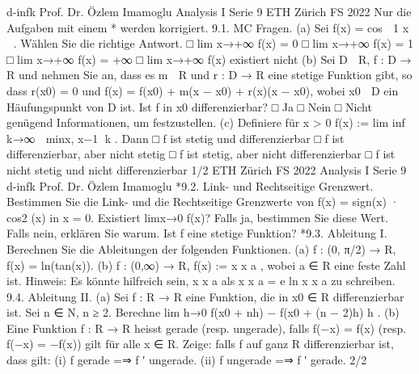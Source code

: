 d-infk
Prof. Dr. Özlem Imamoglu
Analysis I
Serie 9
ETH Zürich
FS 2022
Nur die Aufgaben mit einem * werden korrigiert.
9.1. MC Fragen.
(a) Sei f(x) = cos 
1
x

. Wählen Sie die richtige Antwort.
□ lim x→+∞
f(x) = 0
□ lim x→+∞
f(x) = 1
□ lim x→+∞
f(x) = +∞
□ lim x→+∞
f(x) existiert nicht
(b) Sei D ⊂ R, f : D → R und nehmen Sie an, dass es m ∈ R und r : D → R eine
stetige Funktion gibt, so dass r(x0) = 0 und
f(x) = f(x0) + m(x − x0) + r(x)(x − x0),
wobei x0 ∈ D ein Häufungspunkt von D ist. Ist f in x0 differenzierbar?
□ Ja
□ Nein
□ Nicht genügend Informationen, um festzustellen.
(c) Definiere für x > 0
f(x) := lim inf
k→∞

min{x, x−1
}
k
.
Dann
□ f ist stetig und differenzierbar
□ f ist differenzierbar, aber nicht stetig
□ f ist stetig, aber nicht differenzierbar
□ f ist nicht stetig und nicht differenzierbar
1/2
ETH Zürich
FS 2022
Analysis I
Serie 9
d-infk
Prof. Dr. Özlem Imamoglu
*9.2. Link- und Rechtseitige Grenzwert. Bestimmen Sie die Link- und die
Rechtseitige Grenzwerte von
f(x) = sign(x) · cos2
(x)
in x = 0. Existiert limx→0
f(x)? Falls ja, bestimmen Sie diese Wert. Falls nein, erklären
Sie warum. Ist f eine stetige Funktion?
*9.3. Ableitung I. Berechnen Sie die Ableitungen der folgenden Funktionen.
(a) f : (0, π/2) → R, f(x) = ln(tan(x)).
(b) f : (0,∞) → R, f(x) := x
x
a
, wobei a ∈ R eine feste Zahl ist.
Hinweis: Es könnte hilfreich sein, x
x
a
als x
x
a
= e
ln x
x
a
zu schreiben.
9.4. Ableitung II.
(a) Sei f : R → R eine Funktion, die in x0 ∈ R differenzierbar ist. Sei n ∈ N, n ≥ 2.
Berechne
lim
h→0
f(x0 + nh) − f(x0 + (n − 2)h)
h
.
(b) Eine Funktion f : R → R heisst gerade (resp. ungerade), falls f(−x) = f(x)
(resp. f(−x) = −f(x)) gilt für alle x ∈ R.
Zeige: falls f auf ganz R differenzierbar ist, dass gilt:
(i) f gerade =⇒ f
′ ungerade.
(ii) f ungerade =⇒ f
′ gerade.
2/2
